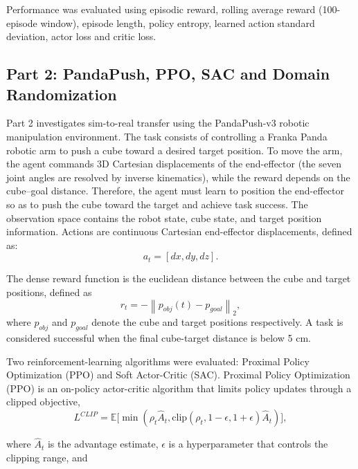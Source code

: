 Performance was evaluated using episodic reward, rolling average reward (100-episode window),
episode length, policy entropy, learned action standard deviation, actor loss and critic loss.
























\subsection{Part 2: PandaPush, PPO, SAC and Domain Randomization}

Part 2 investigates sim-to-real transfer using the PandaPush-v3 robotic manipulation environment. The task consists of controlling a Franka Panda robotic arm to push a cube toward a desired target position.
To move the arm, the agent commands 3D Cartesian displacements of the end-effector (the seven joint angles are resolved by inverse kinematics), while the reward depends on the cube--goal distance.
Therefore, the agent must learn to position the end-effector so as to push the cube toward the target and achieve task success.
The observation space contains the robot state, cube state, and target position information. Actions are continuous Cartesian end-effector displacements, defined as:
\[
a_t=[dx,dy,dz].
\]

The dense reward function is the euclidean distance between the cube and target positions, defined as
\[
r_t = -\left\| p_{obj}(t)-p_{goal} \right\|_2,
\]
where $p_{obj}$ and $p_{goal}$ denote the cube and target positions respectively. A task is considered successful when the final cube-target distance is below 5 cm.

Two reinforcement-learning algorithms were evaluated: Proximal Policy Optimization (PPO) and Soft Actor-Critic (SAC).
Proximal Policy Optimization (PPO) is an on-policy actor-critic algorithm that limits policy updates through a clipped objective,
\[
L^{CLIP} = \mathbb E \Big[ \min( \rho_t \hat A_t, \text{clip}(\rho_t,1-\epsilon,1+\epsilon)\hat A_t ) \Big],
\]

where $\hat A_t$ is the advantage estimate, $\epsilon$ is a hyperparameter that controls the clipping range, and

